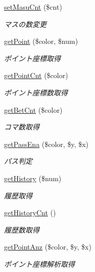 \begin{DoxyCompactItemize}
\hyperlink{class_reversi_ab6853cc0f53e50a70d576f15296f0864}{set\+Masu\+Cnt} (\$cnt)
\begin{DoxyCompactList}\small\item\em マスの数変更 \end{DoxyCompactList}\item 
\hyperlink{class_reversi_ad059cc09b0001edd980f43770380b863}{get\+Point} (\$color, \$num)
\begin{DoxyCompactList}\small\item\em ポイント座標取得 \end{DoxyCompactList}\item 
\hyperlink{class_reversi_af538d04718f177f71461f582f3bd8eba}{get\+Point\+Cnt} (\$color)
\begin{DoxyCompactList}\small\item\em ポイント座標数取得 \end{DoxyCompactList}\item 
\hyperlink{class_reversi_acb1491c467c3065beece256256f5f59d}{get\+Bet\+Cnt} (\$color)
\begin{DoxyCompactList}\small\item\em コマ数取得 \end{DoxyCompactList}\item 
\hyperlink{class_reversi_a123959981f8e1d48fc7b9d183a5c6d0a}{get\+Pass\+Ena} (\$color, \$y, \$x)
\begin{DoxyCompactList}\small\item\em パス判定 \end{DoxyCompactList}\item 
\hyperlink{class_reversi_a41cae82a798f2b3d0684bda44b837fcf}{get\+History} (\$num)
\begin{DoxyCompactList}\small\item\em 履歴取得 \end{DoxyCompactList}\item 
\hyperlink{class_reversi_a004834cf9f95ab56b62c1305bbc68ce2}{get\+History\+Cnt} ()
\begin{DoxyCompactList}\small\item\em 履歴数取得 \end{DoxyCompactList}\item 
\hyperlink{class_reversi_af1a30d438a7d17f31353b9d4bfe9cb65}{get\+Point\+Anz} (\$color, \$y, \$x)
\begin{DoxyCompactList}\small\item\em ポイント座標解析取得 \end{DoxyCompactList}\item 

\end{DoxyCompactItemize}
